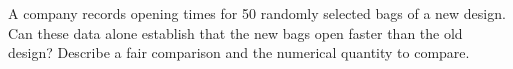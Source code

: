 A company records opening times for 50 randomly selected bags of a new design. Can these data alone establish that the new bags open faster than the old design? Describe a fair comparison and the numerical quantity to compare.
